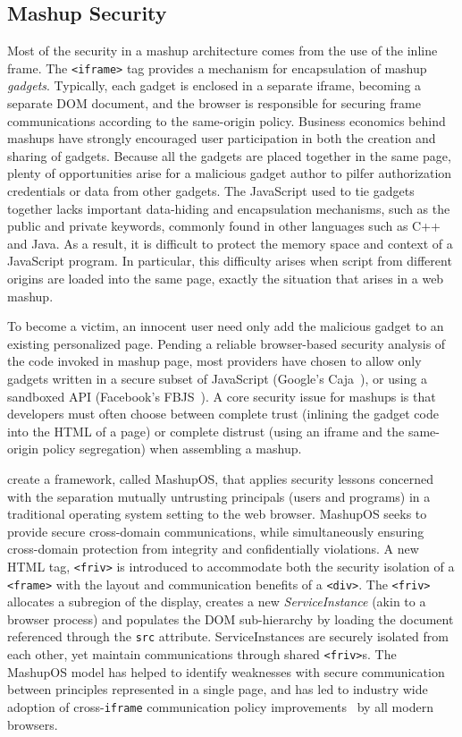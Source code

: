 \documentclass{acmtrans2m}
\begin{document}
\subsection{Mashup Security}
Most of the security in a mashup architecture comes from the use of the inline frame.
The \texttt{<iframe>} tag provides a mechanism for encapsulation of mashup \emph{gadgets}.
Typically, each gadget is enclosed in a separate iframe, becoming a separate DOM document, and the browser is responsible for securing frame communications according to the same-origin policy.
Business economics behind mashups have strongly encouraged user participation in both the creation and sharing of gadgets.
Because all the gadgets are placed together in the same page, plenty of opportunities arise for a malicious gadget author to pilfer authorization credentials or data from other gadgets.
The JavaScript used to tie gadgets together lacks important data-hiding and encapsulation mechanisms, such as the public and private keywords, commonly found in other languages such as C++ and Java.
As a result, it is difficult to protect the memory space and context of a JavaScript program.
In particular, this difficulty arises when script from different origins are loaded into the same page, exactly the situation that arises in a web mashup.

To become a victim, an innocent user need only add the malicious gadget to an existing personalized page.
Pending a reliable browser-based security analysis of the code invoked in mashup page, most providers have chosen to allow only gadgets written in a secure subset of JavaScript (Google's Caja~\cite{caja}), or using a sandboxed API (Facebook's FBJS~\cite{fbjs}).
A core security issue for mashups is that developers must often choose between complete trust (inlining the gadget code into the HTML of a page) or complete distrust (using an iframe and the same-origin policy segregation) when assembling a mashup.

 create a framework, called \mbox{MashupOS}, that applies security lessons concerned with the separation mutually untrusting principals (users and programs) in a traditional operating system setting to the web browser.
\mbox{MashupOS} seeks to provide secure cross-domain communications, while simultaneously ensuring cross-domain protection from integrity and confidentially violations.
A new HTML tag, \texttt{<friv>} is introduced to accommodate both the security isolation of a \texttt{<frame>} with the layout and communication benefits of a \texttt{<div>}.
The \texttt{<friv>} allocates a subregion of the display, creates a new \emph{ServiceInstance} (akin to a browser process) and populates the DOM sub-hierarchy by loading the document referenced through the \texttt{src} attribute.
ServiceInstances are securely isolated from each other, yet maintain communications through shared \texttt{<friv>}s.
The MashupOS model has helped to identify weaknesses with secure communication between principles represented in a single page, and has led to industry wide adoption of cross-\texttt{iframe} communication policy improvements~\cite{secureframes} by all modern browsers.
\end{document}
